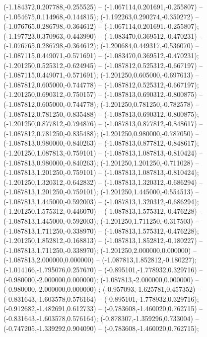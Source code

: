  (-1.184372,0.207788,-0.255525) -- (-1.067114,0.201691,-0.255807) -- (-1.054675,0.114968,-0.144815);
 (-1.192263,0.290274,-0.350272) -- (-1.076765,0.286798,-0.364612) -- (-1.067114,0.201691,-0.255807);
 (-1.197723,0.370963,-0.443990) -- (-1.083470,0.369512,-0.470231) -- (-1.076765,0.286798,-0.364612);
 (-1.200684,0.449317,-0.536070) -- (-1.087115,0.449071,-0.571691) -- (-1.083470,0.369512,-0.470231);
 (-1.201250,0.525312,-0.624945) -- (-1.087812,0.525312,-0.667197) -- (-1.087115,0.449071,-0.571691);
 (-1.201250,0.605000,-0.697613) -- (-1.087812,0.605000,-0.744778) -- (-1.087812,0.525312,-0.667197);
 (-1.201250,0.690312,-0.750157) -- (-1.087813,0.690312,-0.800875) -- (-1.087812,0.605000,-0.744778);
 (-1.201250,0.781250,-0.782578) -- (-1.087812,0.781250,-0.835488) -- (-1.087813,0.690312,-0.800875);
 (-1.201250,0.877812,-0.794876) -- (-1.087813,0.877812,-0.848617) -- (-1.087812,0.781250,-0.835488);
 (-1.201250,0.980000,-0.787050) -- (-1.087813,0.980000,-0.840263) -- (-1.087813,0.877812,-0.848617);
 (-1.201250,1.087813,-0.759101) -- (-1.087813,1.087813,-0.810424) -- (-1.087813,0.980000,-0.840263);
 (-1.201250,1.201250,-0.711028) -- (-1.087813,1.201250,-0.759101) -- (-1.087813,1.087813,-0.810424);
 (-1.201250,1.320312,-0.642832) -- (-1.087813,1.320312,-0.686294) -- (-1.087813,1.201250,-0.759101);
 (-1.201250,1.445000,-0.554513) -- (-1.087813,1.445000,-0.592003) -- (-1.087813,1.320312,-0.686294);
 (-1.201250,1.575312,-0.446070) -- (-1.087813,1.575312,-0.476228) -- (-1.087813,1.445000,-0.592003);
 (-1.201250,1.711250,-0.317503) -- (-1.087813,1.711250,-0.338970) -- (-1.087813,1.575312,-0.476228);
 (-1.201250,1.852812,-0.168813) -- (-1.087813,1.852812,-0.180227) -- (-1.087813,1.711250,-0.338970);
 (-1.201250,2.000000,0.000000) -- (-1.087813,2.000000,0.000000) -- (-1.087813,1.852812,-0.180227);
 (-1.014166,-1.795076,0.257670) -- (-0.895101,-1.778932,0.329716) -- (-0.980000,-2.000000,0.000000);
 (-1.087813,-2.000000,0.000000) -- (-0.980000,-2.000000,0.000000) ;
 (-0.957093,-1.625781,0.457352) -- (-0.831643,-1.603578,0.576164) -- (-0.895101,-1.778932,0.329716);
 (-0.912682,-1.482691,0.612733) -- (-0.783608,-1.460020,0.762715) -- (-0.831643,-1.603578,0.576164);
 (-0.878307,-1.359296,0.733004) -- (-0.747205,-1.339292,0.904090) -- (-0.783608,-1.460020,0.762715);

